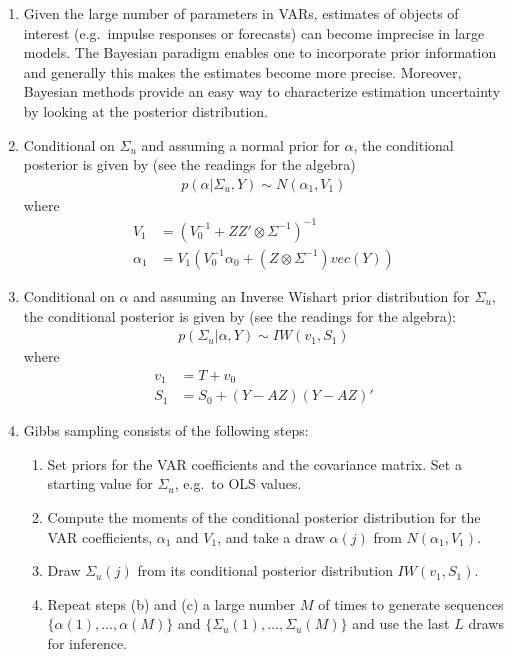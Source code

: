 \begin{enumerate}

\item Given the large number of parameters in VARs,
estimates of objects of interest (e.g.\ impulse responses or forecasts)
can become imprecise in large models.
The Bayesian paradigm enables one to incorporate prior information
and generally this makes the estimates become more precise.
Moreover, Bayesian methods provide an easy way to characterize estimation uncertainty
by looking at the posterior distribution.

\item Conditional on \(\Sigma_u\) and assuming a normal prior for \(\alpha \),
the conditional posterior is given by (see the readings for the algebra)
\begin{align*}
p(\alpha|\Sigma_u,Y) \sim N(\alpha_1,V_1)
\end{align*}
where
\begin{align*}
V_1 &= {(V_0^{-1}+ZZ' \otimes \Sigma^{-1})}^{-1}\\
\alpha_1 &= V_1 (V_0^{-1} \alpha_0 + (Z \otimes \Sigma^{-1})vec(Y))
\end{align*}

\item Conditional on \(\alpha \) and assuming an Inverse Wishart prior distribution for \(\Sigma_u\),
the conditional posterior is given by (see the readings for the algebra):
\begin{align*}
p(\Sigma_u|\alpha,Y) \sim IW(v_1, S_1)
\end{align*}
where
\begin{align*}
v_1 &= T + v_0
\\
S_1 &= S_0 + (Y - AZ)(Y - AZ)'
\end{align*}

\item Gibbs sampling consists of the following steps:
\begin{enumerate}
    \item Set priors for the VAR coefficients and the covariance matrix.
    Set a starting value for \(\Sigma_u\), e.g.\ to OLS values.
    \item Compute the moments of the conditional posterior distribution for the VAR coefficients,
    \(\alpha_1\) and \(V_1\), and take a draw \(\alpha(j)\) from \(N(\alpha_1,V_1)\).
    \item Draw \(\Sigma_u(j)\) from its conditional posterior distribution \(IW(v_1,S_1)\).
    \item Repeat steps (b) and (c) a large number \(M\) of times to generate sequences
    \( \{ \alpha(1),\ldots,\alpha(M) \} \) and \( \{\Sigma_u(1),\ldots,\Sigma_u(M)\} \)
    and use the last \(L\) draws for inference.
\end{enumerate}


\end{enumerate}
